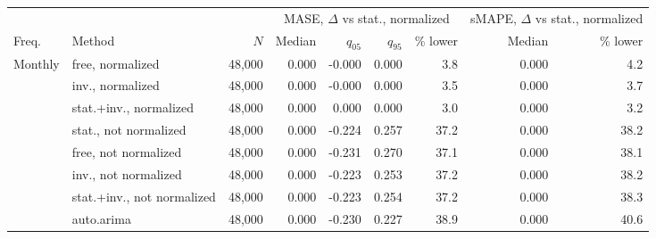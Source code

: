 \begin{tabular}{llrrrrrrr}
\toprule
 & & & \multicolumn{4}{c}{MASE, $\Delta$ vs stat., normalized} & \multicolumn{2}{c}{sMAPE, $\Delta$ vs stat., normalized} \\
\cmidrule(lr){4-7}\cmidrule(lr){8-9}
Freq. & Method & $N$ & Median & $q_{05}$ & $q_{95}$ & \% lower & Median & \% lower \\
\midrule
Monthly & free, normalized & 48{,}000 & 0.000 & -0.000 & 0.000 & 3.8 & 0.000 & 4.2 \\
 & inv., normalized & 48{,}000 & 0.000 & -0.000 & 0.000 & 3.5 & 0.000 & 3.7 \\
 & stat.+inv., normalized & 48{,}000 & 0.000 & 0.000 & 0.000 & 3.0 & 0.000 & 3.2 \\
 & stat., not normalized & 48{,}000 & 0.000 & -0.224 & 0.257 & 37.2 & 0.000 & 38.2 \\
 & free, not normalized & 48{,}000 & 0.000 & -0.231 & 0.270 & 37.1 & 0.000 & 38.1 \\
 & inv., not normalized & 48{,}000 & 0.000 & -0.223 & 0.253 & 37.2 & 0.000 & 38.2 \\
 & stat.+inv., not normalized & 48{,}000 & 0.000 & -0.223 & 0.254 & 37.2 & 0.000 & 38.3 \\
 & auto.arima & 48{,}000 & 0.000 & -0.230 & 0.227 & 38.9 & 0.000 & 40.6 \\
\bottomrule
\end{tabular}
